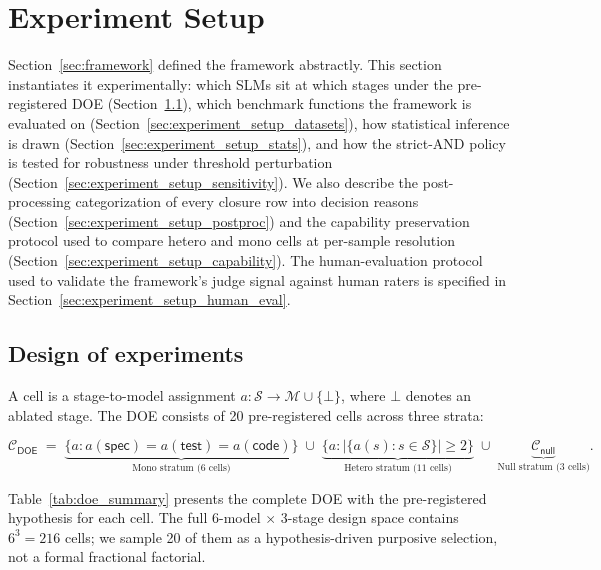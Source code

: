 \section{Experiment Setup}
\label{sec:experiment_setup}

Section~\ref{sec:framework} defined the framework abstractly. This
section instantiates it experimentally: which SLMs sit at which stages
under the pre-registered DOE (Section~\ref{sec:experiment_setup_doe}),
which benchmark functions the framework is evaluated on
(Section~\ref{sec:experiment_setup_datasets}), how statistical inference
is drawn (Section~\ref{sec:experiment_setup_stats}), and how the
strict-AND policy is tested for robustness under threshold perturbation
(Section~\ref{sec:experiment_setup_sensitivity}). We also describe the
post-processing categorization of every closure row into decision
reasons (Section~\ref{sec:experiment_setup_postproc}) and the capability
preservation protocol used to compare hetero and mono cells at
per-sample resolution (Section~\ref{sec:experiment_setup_capability}).
The human-evaluation protocol used to validate the framework's judge
signal against human raters is specified in
Section~\ref{sec:experiment_setup_human_eval}.

\subsection{Design of experiments}
\label{sec:experiment_setup_doe}

A cell is a stage-to-model assignment $a : \mathcal{S} \to \mathcal{M} \cup \{\bot\}$, where $\bot$ denotes an ablated stage. The DOE consists of 20 pre-registered cells across three strata:

\begin{equation}
  \mathcal{C}_{\textsf{DOE}} \;=\;
  \underbrace{\bigl\{a : a(\textsf{spec}) = a(\textsf{test}) = a(\textsf{code})\bigr\}}_{\text{Mono stratum (6 cells)}}
  \;\cup\;
  \underbrace{\bigl\{a : |\{a(s) : s \in \mathcal{S}\}| \geq 2\bigr\}}_{\text{Hetero stratum (11 cells)}}
  \;\cup\;
  \underbrace{\mathcal{C}_{\textsf{null}}}_{\text{Null stratum (3 cells)}}.
  \label{eq:doe}
\end{equation}





Table~\ref{tab:doe_summary} presents the complete DOE with the pre-registered hypothesis for each cell. The full 6-model $\times$ 3-stage design space contains $6^3 = 216$ cells; we sample 20 of them as a hypothesis-driven purposive selection, not a formal fractional factorial.

